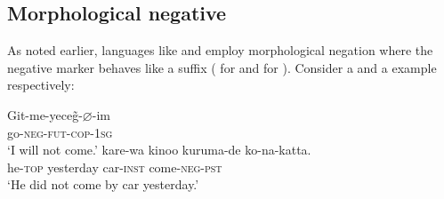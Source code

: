 \documentclass[output=paper
	        ,collection
	        ,collectionchapter
 	        ,biblatex
                ,babelshorthands
                ,newtxmath
                ,draftmode
                ,colorlinks, citecolor=brown
]{langscibook}
\begin{document}
\begin{exe}
\begin{xlist}
\begin{exe}
\begin{xlist}
%




%

\section{Morphological negative}

As noted earlier, languages like  and  employ morphological negation where the negative marker behaves like a suffix (\citealt[]{kelepir} for
 and \citealt{Kato:97,Kato:00} for ). Consider
a  and a  example respectively:

\eal
\ex
\label{negation-turkish-jap}
\gll Git-me-yece\~{g}-$\varnothing$-im \\
     go-\textsc{neg-fut-cop}-\textsc{1sg} \\
\glt `I will not come.'
\ex
\gll kare-wa kinoo kuruma-de ko-na-katta. \\
     he-\textsc{top} yesterday car-\textsc{inst} come-\textsc{neg}-\textsc{pst} \\
\glt `He did not come by car yesterday.'
\zl


\end{xlist}
\end{exe}
\end{xlist}
\end{exe}
\end{document}
